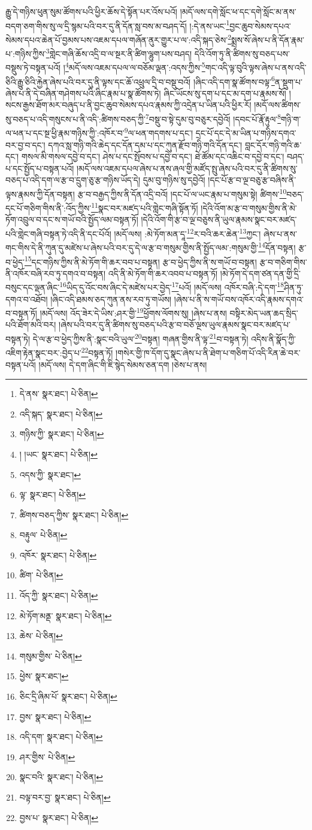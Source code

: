 རྒྱུ་དེ་གཉིས་ཕུན་སུམ་ཚོགས་པའི་ཕྱིར་ཆོས་དེ་སྟོན་པར་འོས་པའོ། །མདོ་ལས་དགེ་སློང་ཕ་དང་དགེ་སློང་མ་ནས་བདག་ཅག་གིས་སུ་ལ་དྲི་སྙམ་པའི་བར་དུ་ནི་དོན་སླ་བས་མ་བཤད་དོ། །:དེ་ནས་ཡང་\footnote{དེ་ནས་  སྣར་ཐང་།  པེ་ཅིན། }བྱང་ཆུབ་སེམས་དཔའ་སེམས་དཔའ་ཆེན་པོ་བྱམས་པས་འཇམ་དཔལ་གཞོན་ནུར་གྱུར་པ་ལ་:འདི་སྐད་ཅེས་\footnote{འདི་སྐད་  སྣར་ཐང་།  པེ་ཅིན། }སྨྲས་སོ་ཞེས་པ་ནི་དོན་རྣམ་པ་:གཉིས་ཀྱིས་\footnote{གཉིས་ཀྱི་  སྣར་ཐང་།  པེ་ཅིན། }གླེང་གཞི་ཆོས་འདྲི་བ་ལ་སྔར་ནི་ཚིག་ལྷུག་པས་བཤད། དེའི་འོག་ཏུ་ནི་ཚིགས་སུ་བཅད་པས་བསྡུས་ཏེ་བསྟན་པའོ། །\footnote{། །ཡང་  སྣར་ཐང་།  པེ་ཅིན། }མདོ་ལས་འཇམ་དཔལ་ལ་བཅོམ་ལྡན་:འདས་ཀྱིས་\footnote{འདས་ཀྱི་  སྣར་ཐང་། }གང་འདི་ལྟ་བུའི་ལྟས་ཞེས་པ་ནས་འདི་ཅིའི་རྒྱུ་ཅིའི་རྐྱེན་ཞེས་པའི་བར་དུ་ནི་ལྟས་དང་ཆོ་འཕྲུལ་དྲི་བ་བསྡུ་བའོ། །ཞིང་འདི་དག་སྣ་ཚོགས་བལྟ་\footnote{ལྟ་  སྣར་ཐང་།  པེ་ཅིན། }ན་སྡུག་པ་ཞེས་པ་ནི་དེ་བཞིན་གཤེགས་པའི་ཞིང་རྣམ་པ་སྣ་ཚོགས་ཏེ། ཞིང་ཡོངས་སུ་དག་པ་དང་མ་དག་པ་རྣམས་སོ། །སངས་རྒྱས་ཐོག་མར་བཞུད་པ་ནི་བྱང་ཆུབ་སེམས་དཔའ་རྣམས་ཀྱི་འདྲེན་པ་ཡིན་པའི་ཕྱིར་རོ། །མདོ་ལས་ཚིགས་སུ་བཅད་པ་འདི་གསུངས་པ་ནི་འདི་:ཚིགས་བཅད་ཀྱི་\footnote{ཚིགས་བཅད་ཀྱིས་  སྣར་ཐང་།  པེ་ཅིན། }བསྡུ་བ་སྟེ་དུམ་བུ་བཅུར་དབྱེའོ། །དབང་པོ་རྣོ་རྟུལ་\footnote{བརྟུལ་  པེ་ཅིན། }གཉི་ག་ལ་ཕན་པ་དང་སྔ་ཕྱི་རྣམ་གཉིས་ཀྱི་:འཁོར་བ་\footnote{འཁོར་  སྣར་ཐང་།  པེ་ཅིན། }ལ་ཕན་གདགས་པ་དང་། དྲང་པོ་དང་དེ་མ་ཡིན་པ་གཉིས་དགའ་བར་བྱ་བ་དང་། དཀའ་སླ་གཉི་གའི་ཆེད་དང་དོན་དམ་པ་དང་ཀུན་རྫོབ་གཉི་གའི་དོན་དང་། བླང་དོར་གཉི་གའི་ཆ་དང་། གསལ་མི་གསལ་དབྱེ་བ་དང་། ཤེས་པ་དང་སྤོབས་པ་དབྱེ་བ་དང་། ཐེ་ཚོམ་དང་འཆིང་བ་དབྱེ་བ་དང་། བཤད་པ་དང་སྤྱོད་པ་བསྟན་པའོ། །མདོ་ལས་འཇམ་དཔལ་ཞེས་པ་ནས་ཞལ་གྱི་མཛོད་སྤུ་ཞེས་པའི་བར་དུ་ནི་ཚིགས་སུ་བཅད་པ་འདི་དག་ལ་རྩ་བ་དྲུག་ཅུ་རྩ་གཉིས་ཡོད་དེ། དུམ་བུ་གཉིས་སུ་དབྱེའོ། །དང་པོ་རྩ་བ་ལྔ་བཅུ་རྩ་བཞིས་ནི་ལྟས་རྣམས་ཀྱི་དོན་བསྟན། རྩ་བ་བརྒྱད་ཀྱིས་ནི་དོན་འདྲི་བའོ། །དང་པོ་ལ་ཡང་རྣམ་པ་གསུམ་སྟེ། ཚིགས་\footnote{ཚིག་  པེ་ཅིན། }བཅད་དང་པོ་གཅིག་གིས་ནི་:འོད་ཀྱིས་\footnote{འོད་ཀྱི་  སྣར་ཐང་།  པེ་ཅིན། }སྣང་བར་མཛད་པའི་གླེང་གཞི་སྟོན་ཏོ། །དེའི་འོག་མ་རྩ་བ་གསུམ་གྱིས་ནི་མེ་ཏོག་འབྲུལ་བ་དང་ས་གཡོ་བའི་སྤྱོད་ལམ་བསྟན་ཏོ། །དེའི་འོག་གི་རྩ་བ་ལྔ་བཅུས་ནི་ཡུལ་རྣམས་སྣང་བར་མཛད་པའི་གླེང་གཞི་བསྟན་ཏེ་འདི་ནི་དང་པོའོ། །མདོ་ལས། :མེ་ཏོག་མན་དཱ་\footnote{མེ་ཏོག་མནྡ་  སྣར་ཐང་།  པེ་ཅིན། }ར་བའི་ཆར་ཆེན་\footnote{ཆེས་  པེ་ཅིན། }ཀྱང་། ཞེས་པ་ནས་གང་གིས་དེ་ནི་ཀུན་དུ་མཛེས་པ་ཞེས་པའི་བར་དུ་དེ་ལ་རྩ་བ་གསུམ་གྱིས་ནི་སྤྱོད་ལམ་:གསུམ་གྱི་\footnote{གསུམ་གྱིས་  པེ་ཅིན། }དོན་བསྟན། རྩ་བ་ཕྱེད་\footnote{ཕྱེས་  སྣར་ཐང་། }དང་གཉིས་ཀྱིས་ནི་མེ་ཏོག་གི་ཆར་བབ་པ་བསྟན། རྩ་བ་ཕྱེད་ཀྱིས་ནི་ས་གཡོ་བ་བསྟན། རྩ་བ་གཅིག་གིས་ནི་འཁོར་བཞི་རབ་ཏུ་དགའ་བ་བསྟན། འདི་ནི་མེ་ཏོག་གི་ཆར་འབབ་པ་བསྟན་ཏོ། །མེ་ཏོག་དེ་དག་ཙན་དན་གྱི་དྲི་བསུང་དང་ལྡན་ཞིང་\footnote{ཅིང་དྲི་ཞིམ་པོ་  སྣར་ཐང་།  པེ་ཅིན། }ཡིད་དུ་འོང་བས་ཞིང་དེ་མཛེས་པར་བྱེད་\footnote{བྱས་  སྣར་ཐང་།  པེ་ཅིན། }པའོ། །མདོ་ལས། འཁོར་བཞི་:དེ་དག་\footnote{འདི་དག་  སྣར་ཐང་།  པེ་ཅིན། }ཤིན་ཏུ་དགའ་བ་འཐོབ། །ཞིང་འདི་ཐམས་ཅད་ཀུན་ནས་རབ་ཏུ་གཡོས། །ཞེས་པ་ནི་ས་གཡོ་བས་འཁོར་འདི་རྣམས་དགའ་བ་བསྟན་ཏོ། །མདོ་ལས། འོད་ཟེར་དེ་ཡིས་:ཤར་གྱི་\footnote{ཤར་གྱིས་  པེ་ཅིན། }ཕྱོགས་ལོགས་སུ། །ཞེས་པ་ནས། བསྟིར་མེད་ཡན་ཆད་སྲིད་པའི་ཐོག་མའི་བར། །ཞེས་པའི་བར་དུ་ནི་ཚིགས་སུ་བཅད་པའི་རྩ་བ་བཅོ་ལྔས་ཡུལ་རྣམས་སྣང་བར་མཛད་པ་བསྟན་ཏེ། དེ་ལ་རྩ་བ་ཕྱེད་ཀྱིས་ནི་:སྣང་བའི་ཡུལ་\footnote{སྣང་བའི་  སྣར་ཐང་།  པེ་ཅིན། }བསྟན། གཞན་གྱིས་ནི་ལྟ་\footnote{བལྟ་བར་བྱ་  སྣར་ཐང་།  པེ་ཅིན། }བ་བསྟན་ཏེ། འདིས་ནི་སྣོད་ཀྱི་འཇིག་རྟེན་སྣང་བར་:བྱེད་པ་\footnote{བྱས་པ་  སྣར་ཐང་།  པེ་ཅིན། }བསྟན་ཏོ། །གསེར་གྱི་ཁ་དོག་དུ་སྣང་ཞེས་པ་ནི་ཐེག་པ་གཅིག་པོ་འདི་རིན་ཆེ་བར་བསྟན་པའོ། །མདོ་ལས། དེ་དག་ཞིང་གི་ཇི་སྙེད་སེམས་ཅན་དག །ཅེས་པ་ནས། 